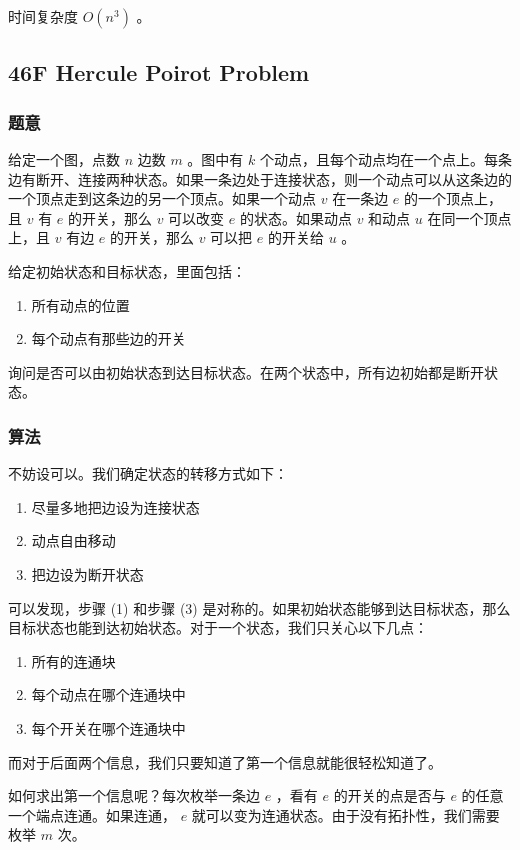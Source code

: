 \documentclass[11pt]{article}
\begin{document}
    时间复杂度 $O(n^3)$ 。
\subsection{46F   Hercule Poirot Problem}
\label{sec-3-9}
\subsubsection{题意}
\label{sec-3-9-1}

    给定一个图，点数 $n$ 边数 $m$ 。图中有 $k$ 个动点，且每个动点均在一个点上。每条边有断开、连接两种状态。如果一条边处于连接状态，则一个动点可以从这条边的一个顶点走到这条边的另一个顶点。如果一个动点 $v$ 在一条边 $e$ 的一个顶点上，且 $v$ 有 $e$ 的开关，那么 $v$ 可以改变 $e$ 的状态。如果动点 $v$ 和动点 $u$ 在同一个顶点上，且 $v$ 有边 $e$ 的开关，那么 $v$ 可以把 $e$ 的开关给 $u$ 。

    给定初始状态和目标状态，里面包括：
\begin{enumerate}
\item 所有动点的位置
\item 每个动点有那些边的开关
\end{enumerate}
    询问是否可以由初始状态到达目标状态。在两个状态中，所有边初始都是断开状态。
\subsubsection{算法}
\label{sec-3-9-2}

    不妨设可以。我们确定状态的转移方式如下：
\begin{enumerate}
\item 尽量多地把边设为连接状态
\item 动点自由移动
\item 把边设为断开状态
\end{enumerate}
    可以发现，步骤 (1) 和步骤 (3) 是对称的。如果初始状态能够到达目标状态，那么目标状态也能到达初始状态。对于一个状态，我们只关心以下几点：
\begin{enumerate}
\item 所有的连通块
\item 每个动点在哪个连通块中
\item 每个开关在哪个连通块中
\end{enumerate}
     而对于后面两个信息，我们只要知道了第一个信息就能很轻松知道了。

     如何求出第一个信息呢？每次枚举一条边 $e$ ，看有 $e$ 的开关的点是否与 $e$ 的任意一个端点连通。如果连通， $e$ 就可以变为连通状态。由于没有拓扑性，我们需要枚举 $m$ 次。
\end{document}
